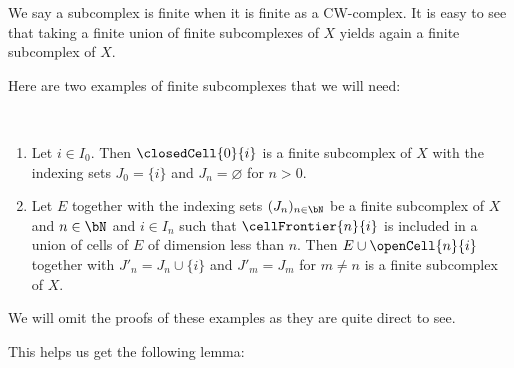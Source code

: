 \begin{rem} \label{rem:unionfinitesubcomplexes}
    We say a subcomplex is finite when it is finite as a CW-complex.
    It is easy to see that taking a finite union of finite subcomplexes of $X$ yields again a finite subcomplex of $X$. \href{https://github.com/scholzhannah/CWComplexes/blob/7be4872a05b534011cc969eb5b80a4b7f0bf57e2/CWcomplexes/subcomplex.lean#L211-L224}{\faExternalLink}
\end{rem}

Here are two examples of finite subcomplexes that we will need:

\begin{example} \label{example:subcomplexes} ~
    \begin{enumerate}
        \item Let $i \in I_0$. Then $\closedCell{0}{i}$ is a finite subcomplex of $X$ with the indexing sets $J_0 = \{i\}$ and $J_n = \varnothing$ for $n > 0$.
        \href{https://github.com/scholzhannah/CWComplexes/blob/7be4872a05b534011cc969eb5b80a4b7f0bf57e2/CWcomplexes/subcomplex.lean#L246-L271}{\faExternalLink}
        \item Let $E$ together with the indexing sets $(J_n)_{n \in \bN}$ be a finite subcomplex of $X$ and $n \in \bN$ and $i \in I_n$ such that $\cellFrontier{n}{i}$ is included in a union of cells of $E$ of dimension less than $n$. 
        Then $E \cup \openCell{n}{i}$ together with $J'_n = J_n \cup \{i\}$ and $J'_m = J_m$ for $m \ne n$ is a finite subcomplex of $X$.
        \href{https://github.com/scholzhannah/CWComplexes/blob/7be4872a05b534011cc969eb5b80a4b7f0bf57e2/CWcomplexes/subcomplex.lean#L308-L334}{\faExternalLink}
       \end{enumerate}
\end{example}

We will omit the proofs of these examples as they are quite direct to see. 

This helps us get the following lemma: 

